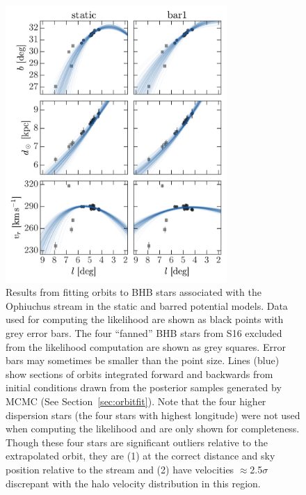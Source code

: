 \documentclass[letterpaper,12pt,preprint]{aastex}
\begin{document}
\begin{figure}[!tbp]
\begin{center}
\includegraphics[width=0.75\textwidth]{figures/orbitfits}
\caption{ Results from fitting orbits to BHB stars associated with the Ophiuchus stream in the static and barred potential models. Data used for computing the likelihood are shown as black points with grey error bars. The four ``fanned'' BHB stars from S16 excluded from the likelihood computation are shown as grey squares. Error bars may sometimes be smaller than the point size. Lines (blue) show sections of orbits integrated forward and backwards from initial conditions drawn from the posterior samples generated by MCMC (See Section~\ref{sec:orbitfit}). Note that the four higher dispersion stars (the four stars with highest longitude) were not used when computing the likelihood and are only shown for completeness. Though these four stars are significant outliers relative to the extrapolated orbit, they are (1) at the correct distance and sky position relative to the stream and (2) have velocities $\approx$2.5$\sigma$ discrepant with the halo velocity distribution in this region.}
\label{fig:orbitfits}
\end{center}
\end{figure}
\end{document}

